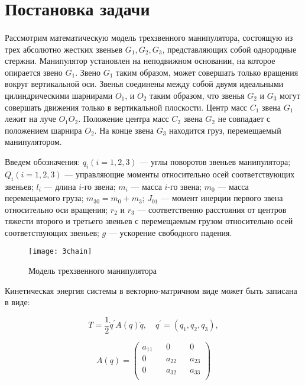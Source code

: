 \section{Постановка задачи} \label{p31}
\paragraph{}
 Рассмотрим математическую модель трехзвенного манипулятора, состоящую из трех абсолютно жестких звеньев $G_1, G_2, G_3$, представляющих собой однородные стержни. Манипулятор установлен на неподвижном основании, на которое опирается звено $G_1$. Звено $G_1$ таким образом, может совершать только вращения вокруг вертикальной оси. Звенья соединены между собой двумя идеальными цилиндрическими шарнирами $O_1$, и $O_2$ таким образом, что звенья $G_2$ и $G_3$ могут совершать движения только в вертикальной плоскости. Центр масс $C_1$ звена $G_1$ лежит на луче  $O_1 O_2$. Положение центра масс $C_2$ звена $G_2$ не совпадает с положением шарнира $O_2$. На конце звена $G_3$ находится груз, перемещаемый манипулятором.
 
 Введем обозначения: $q_i (i=1, 2, 3)$ --- углы поворотов звеньев манипулятора; $Q_i (i = 1, 2, 3)$ ---  управляющие моменты относительно осей соответствующих звеньев; $l_i$  ---  длина   $i$-го звена;   $m_i$ --- масса  $i$-го звена;    $m_0$ ---  масса перемещаемого груза;  $m_{30} = m_0 + m_3$; $J_{01}$  ---  момент инерции первого звена относительно оси вращения; $r_2$ и $r_3$ --- соответственно расстояния от центров тяжести второго и третьего звеньев с перемещаемым грузом относительно осей соответствующих звеньев; $g$ --- ускорение свободного падения.
 
 \begin{figure}[h]
 	\centering
 	\texttt{[image: 3chain]}
 	\caption{Модель трехзвенного манипулятора}
 	\label{fig:manip1}
 \end{figure}
 
 Кинетическая энергия системы в векторно-матричном виде может быть записана в виде:
 
  \begin{equation*}
  T = \frac12 \dot q^{'} A(q) \dot q, \quad q^{'} = (q_1, q_2, q_3),
  \end{equation*}
  
  \begin{equation*}
  A(q) =
  \begin{pmatrix}
  a_{11} && 0 && 0  \\
  0  && a_{22} && a_{23} \\
  0 && a_{32} &&  a_{33}\\
  \end{pmatrix}
  \end{equation*}
  
